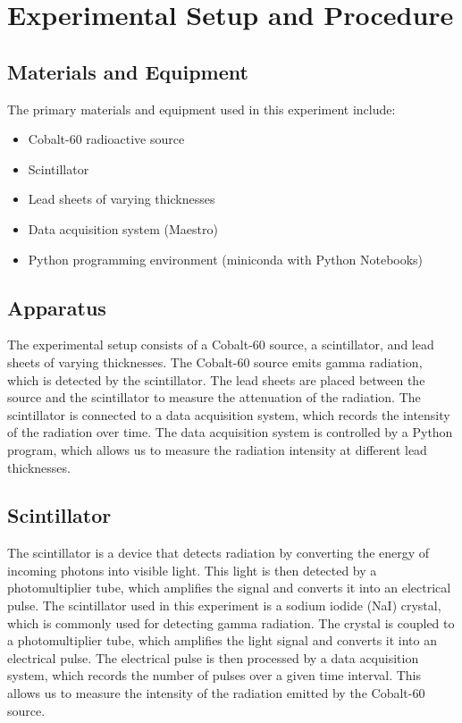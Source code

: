 \documentclass[12pt]{article}
\begin{document}
\section{Experimental Setup and Procedure}
    \subsection{Materials and Equipment}
        The primary materials and equipment used in this experiment include:
        \begin{itemize}
            \item Cobalt-60 radioactive source
            \item Scintillator
            \item Lead sheets of varying thicknesses
            \item Data acquisition system (Maestro)
            \item Python programming environment (miniconda with Python Notebooks)
        \end{itemize}
        
    \subsection{Apparatus}
        The experimental setup consists of a Cobalt-60 source, a scintillator, and lead sheets of varying thicknesses. 
        The Cobalt-60 source emits gamma radiation, which is detected by the scintillator. 
        The lead sheets are placed between the source and the scintillator to measure the attenuation of the radiation. 
        The scintillator is connected to a data acquisition system, which records the intensity of the radiation over time. 
        The data acquisition system is controlled by a Python program, which allows us to measure the radiation intensity at different lead thicknesses.

    \subsection{Scintillator}
        The scintillator is a device that detects radiation by converting the energy of incoming photons into visible light. 
        This light is then detected by a photomultiplier tube, which amplifies the signal and converts it into an electrical pulse. 
        The scintillator used in this experiment is a sodium iodide (NaI) crystal, which is commonly used for detecting gamma radiation. 
        The crystal is coupled to a photomultiplier tube, which amplifies the light signal and converts it into an electrical pulse. 
        The electrical pulse is then processed by a data acquisition system, which records the number of pulses over a given time interval. 
        This allows us to measure the intensity of the radiation emitted by the Cobalt-60 source.
\end{document}
